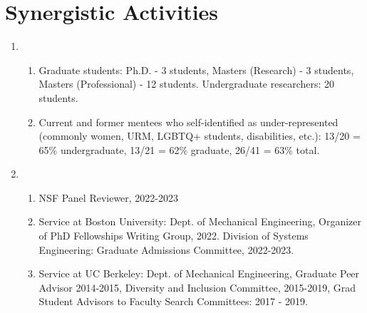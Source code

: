 \documentclass[letterpaper]{deedy-resume} %
\begin{document}
{%
\vspace{-0.2cm}
\section{Synergistic Activities}

\begin{enumerate}\setlength{\itemsep=0.1cm}
\item  {}
\vspace{-0.1cm}
\begin{enumerate}\setlength{\itemsep=0cm}
\item Graduate students: Ph.D. - 3 students, Masters (Research) -  3 students, Masters (Professional) - 12 students. Undergraduate researchers: 20 students.
\item Current and former mentees who self-identified as under-represented (commonly women, URM, LGBTQ+ students, disabilities, etc.): 13/20 = 65\% undergraduate, 13/21 = 62\% graduate, 26/41 = 63\% total.
\end{enumerate}

\vspace{-0.2cm}
\item  {}
\vspace{-0.1cm}
\begin{enumerate}\setlength{\itemsep=0cm}
\item NSF Panel Reviewer, 2022-2023
\item Service at Boston University: Dept. of Mechanical Engineering, Organizer of PhD Fellowships Writing Group, 2022. Division of Systems Engineering: Graduate Admissions Committee, 2022-2023.
\item Service at UC Berkeley: Dept. of Mechanical Engineering, Graduate Peer Advisor 2014-2015, Diversity and Inclusion Committee, 2015-2019, Grad Student Advisors to Faculty Search Committees: 2017 - 2019.
\end{enumerate}


\end{enumerate}}
\end{document}
